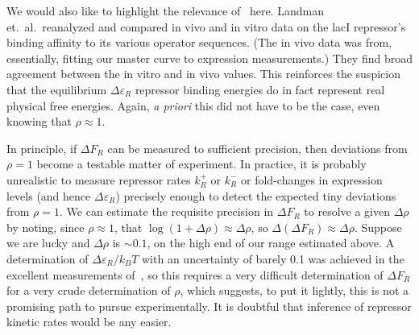 We would also like to highlight the relevance of~\cite{Landman2019} here.
Landman et.\ al.\ reanalyzed and compared in vivo and in vitro data on the lacI
repressor's binding affinity to its various operator sequences. (The in vivo
data was from, essentially, fitting our master curve to expression
measurements.) They find broad agreement between the in vitro and in vivo
values. This reinforces the suspicion that the equilibrium $\Delta\varepsilon_R$
repressor binding energies do in fact represent real physical free energies.
Again, \textit{a priori} this did not have to be the case, even knowing that
$\rho\approx1$.

In principle, if $\Delta F_R$ can be measured to sufficient precision, then
deviations from $\rho=1$ become a testable matter of experiment. In practice, it
is probably unrealistic to measure repressor rates $k_R^+$ or $k_R^-$ or
fold-changes in expression levels (and hence $\Delta\varepsilon_R$) precisely
enough to detect the expected tiny deviations from $\rho=1$. We can estimate the
requisite precision in $\Delta F_R$ to resolve a given $\Delta\rho$ by noting,
since $\rho\approx1$, that $\log(1+\Delta\rho)\approx \Delta\rho$, so
$\Delta(\Delta F_R) \approx \Delta\rho$. Suppose we are lucky and $\Delta\rho$
is $\sim0.1$, on the high end of our range estimated above. A
determination of $\Delta\varepsilon_R/k_BT$ with an uncertainty of barely 0.1
was achieved in the excellent measurements of~\cite{Razo-Mejia2018}, so this
requires a very difficult determination of $\Delta F_R$ for a very crude
determination of $\rho$, which suggests, to put it lightly, this is not a
promising path to pursue experimentally. It is doubtful that inference of
repressor kinetic rates would be any easier.%

